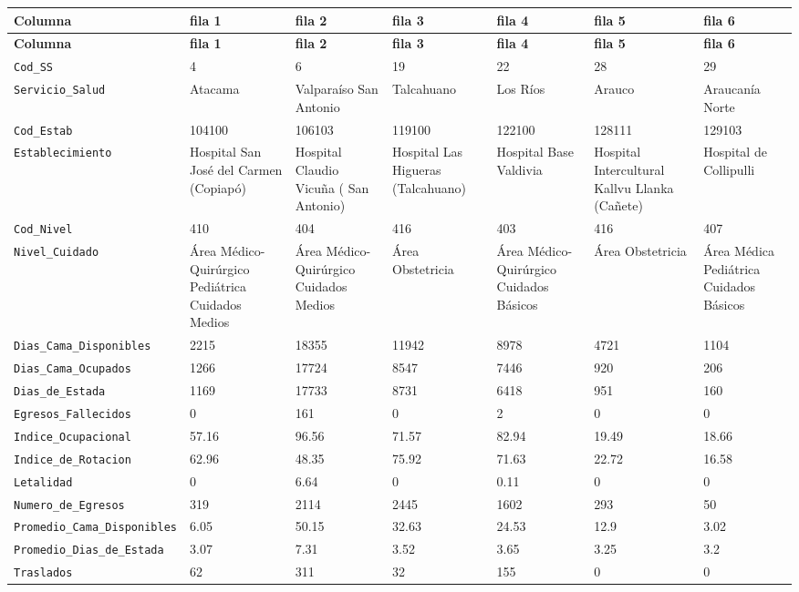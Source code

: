 \documentclass[10pt]{article}
\newcommand{\hdr}[1]{\textbf{\color{white}#1}}
\begin{document}
\footnotesize
\begin{xltabular}{\linewidth}{@{}p{4.3cm} Y Y Y Y Y Y @{}}
\hdr{Columna} & \hdr{fila 1} & \hdr{fila 2} & \hdr{fila 3} & \hdr{fila 4} & \hdr{fila 5} & \hdr{fila 6} \\
\endfirsthead
{}\hdr{Columna} & \hdr{fila 1} & \hdr{fila 2} & \hdr{fila 3} & \hdr{fila 4} & \hdr{fila 5} & \hdr{fila 6} \\
\endhead
{}\texttt{Cod\_\allowbreak{}SS} & 4 & 6 & 19 & 22 & 28 & 29 \\
\texttt{Servicio\_\allowbreak{}Salud} & Atacama & Valparaíso San Antonio & Talcahuano & Los Ríos & Arauco & Araucanía Norte \\
\texttt{Cod\_\allowbreak{}Estab} & 104100 & 106103 & 119100 & 122100 & 128111 & 129103 \\
\texttt{Establecimiento} & Hospital San José del Carmen (Copiapó) & Hospital Claudio Vicuña ( San Antonio) & Hospital Las Higueras (Talcahuano) & Hospital Base Valdivia & Hospital Intercultural Kallvu Llanka (Cañete) & Hospital de Collipulli \\
\texttt{Cod\_\allowbreak{}Nivel} & 410 & 404 & 416 & 403 & 416 & 407 \\
\texttt{Nivel\_\allowbreak{}Cuidado} & Área Médico-{}Qu\allowbreak{}irúrgico Pediátrica Cuidados Medios & Área Médico-{}Qu\allowbreak{}irúrgico Cuidados Medios & Área Obstetricia & Área Médico-{}Qu\allowbreak{}irúrgico Cuidados Básicos & Área Obstetricia & Área Médica Pediátrica Cuidados Básicos \\
\texttt{Dias\_\allowbreak{}Cama\_\allowbreak{}Disponibles} & 2215 & 18355 & 11942 & 8978 & 4721 & 1104 \\
\texttt{Dias\_\allowbreak{}Cama\_\allowbreak{}Ocupados} & 1266 & 17724 & 8547 & 7446 & 920 & 206 \\
\texttt{Dias\_\allowbreak{}de\_\allowbreak{}Estada} & 1169 & 17733 & 8731 & 6418 & 951 & 160 \\
\texttt{Egresos\_\allowbreak{}Fallecidos} & 0 & 161 & 0 & 2 & 0 & 0 \\
\texttt{Indice\_\allowbreak{}Ocupacional} & 57.16 & 96.56 & 71.57 & 82.94 & 19.49 & 18.66 \\
\texttt{Indice\_\allowbreak{}de\_\allowbreak{}Rotacion} & 62.96 & 48.35 & 75.92 & 71.63 & 22.72 & 16.58 \\
\texttt{Letalidad} & 0 & 6.64 & 0 & 0.11 & 0 & 0 \\
\texttt{Numero\_\allowbreak{}de\_\allowbreak{}Egresos} & 319 & 2114 & 2445 & 1602 & 293 & 50 \\
\texttt{Promedio\_\allowbreak{}Cama\_\allowbreak{}Disponibles} & 6.05 & 50.15 & 32.63 & 24.53 & 12.9 & 3.02 \\
\texttt{Promedio\_\allowbreak{}Dias\_\allowbreak{}de\_\allowbreak{}Estada} & 3.07 & 7.31 & 3.52 & 3.65 & 3.25 & 3.2 \\
\texttt{Traslados} & 62 & 311 & 32 & 155 & 0 & 0 \\
\end{xltabular}
\normalsize
\end{document}
